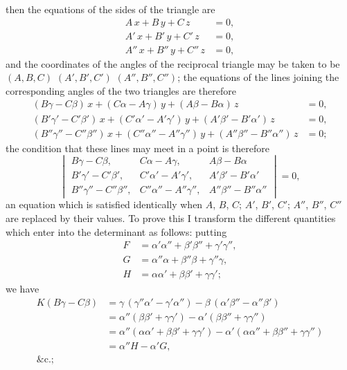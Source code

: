\documentclass[11pt]{article}
\begin{document}
\noindent then the equations of the sides of the triangle are
\begin{align*}
A\,x + B\,y + C\,z &= 0,\\
A'\,x + B'\,y + C'\,z &= 0,\\
A''\,x + B''\,y + C''\,z &= 0,
\end{align*}
and the coordinates of the angles of the reciprocal triangle may be taken to be
$(A, B, C)$ $(A', B', C')$ $(A'', B'', C'')$; the equations of the lines joining the corresponding
angles of the two triangles are therefore
\begin{align*}
(B\gamma - C\beta)\,x + (C\alpha - A\gamma)\,y + (A\beta - B\alpha)\,z &= 0,\\
(B'\gamma' - C'\beta')\,x + (C'\alpha' - A'\gamma')\,y + (A'\beta' - B'\alpha')\,z &= 0,\\
(B''\gamma'' - C''\beta'')\,x + (C''\alpha'' - A''\gamma'')\,y + (A''\beta'' - B''\alpha'')\,z &= 0;
\end{align*}
the condition that these lines may meet in a point is therefore
\[
\begin{vmatrix}
B\gamma - C\beta, & C\alpha - A\gamma, & A\beta - B\alpha\\
B'\gamma' - C'\beta', & C'\alpha' - A'\gamma', & A'\beta' - B'\alpha'\\
B''\gamma'' - C''\beta'', & C''\alpha'' - A''\gamma'', & A''\beta'' - B''\alpha''
\end{vmatrix} = 0,
\]
an equation which is satisfied identically when $A$, $B$, $C$; $A'$, $B'$, $C'$; $A''$, $B''$, $C''$ are
replaced by their values. To prove this I transform the different quantities which
enter into the determinant as follows: putting
\begin{align*}
F &= \alpha'\alpha'' + \beta'\beta'' + \gamma'\gamma'',\\
G &= \alpha''\alpha + \beta''\beta + \gamma''\gamma,\\
H &= \alpha\alpha' + \beta\beta' + \gamma\gamma';
\end{align*}
we have
\begin{align*}
K(B\gamma - C\beta) &= \gamma\,(\gamma''\alpha' - \gamma'\alpha'') - \beta\,(\alpha'\beta'' - \alpha''\beta')\\
&= \alpha''(\beta\beta' + \gamma\gamma') - \alpha'(\beta\beta'' + \gamma\gamma'')\\
&= \alpha''(\alpha\alpha' + \beta\beta' + \gamma\gamma') - \alpha'(\alpha\alpha'' + \beta\beta'' + \gamma\gamma'')\\
&= \alpha''H - \alpha'G,\\
\&\text{c.};
\end{align*}
\end{document}
